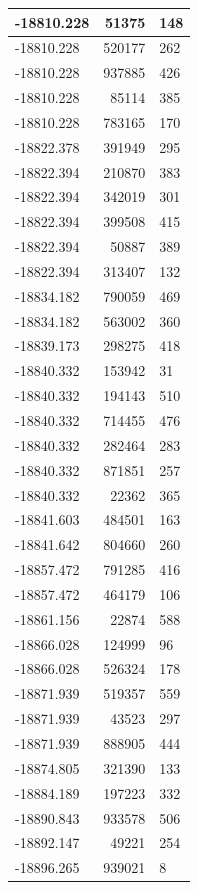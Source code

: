 \documentclass[]{book}
\theoremstyle{definition}
\theoremstyle{definition}
\theoremstyle{definition}
\theoremstyle{remark}
\begin{document}
\begin{tabular}{l|r|l}
\hline
-18810.228 & 51375 & 148\\
\hline
-18810.228 & 520177 & 262\\
\hline
-18810.228 & 937885 & 426\\
\hline
-18810.228 & 85114 & 385\\
\hline
-18810.228 & 783165 & 170\\
\hline
-18822.378 & 391949 & 295\\
\hline
-18822.394 & 210870 & 383\\
\hline
-18822.394 & 342019 & 301\\
\hline
-18822.394 & 399508 & 415\\
\hline
-18822.394 & 50887 & 389\\
\hline
-18822.394 & 313407 & 132\\
\hline
-18834.182 & 790059 & 469\\
\hline
-18834.182 & 563002 & 360\\
\hline
-18839.173 & 298275 & 418\\
\hline
-18840.332 & 153942 & 31\\
\hline
-18840.332 & 194143 & 510\\
\hline
-18840.332 & 714455 & 476\\
\hline
-18840.332 & 282464 & 283\\
\hline
-18840.332 & 871851 & 257\\
\hline
-18840.332 & 22362 & 365\\
\hline
-18841.603 & 484501 & 163\\
\hline
-18841.642 & 804660 & 260\\
\hline
-18857.472 & 791285 & 416\\
\hline
-18857.472 & 464179 & 106\\
\hline
-18861.156 & 22874 & 588\\
\hline
-18866.028 & 124999 & 96\\
\hline
-18866.028 & 526324 & 178\\
\hline
-18871.939 & 519357 & 559\\
\hline
-18871.939 & 43523 & 297\\
\hline
-18871.939 & 888905 & 444\\
\hline
-18874.805 & 321390 & 133\\
\hline
-18884.189 & 197223 & 332\\
\hline
-18890.843 & 933578 & 506\\
\hline
-18892.147 & 49221 & 254\\
\hline
-18896.265 & 939021 & 8\\

\end{tabular}
\end{document}
